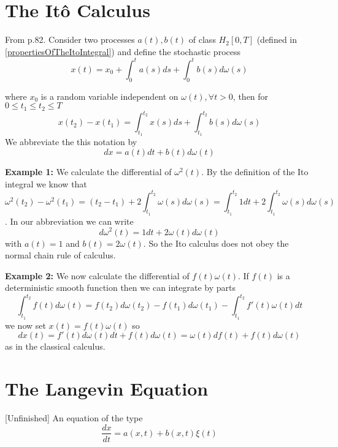 \documentclass[12pt]{report}
\begin{document}
\section{The It\^{o} Calculus}
From \cite{schuss2009theory} p.82. Consider two processes $a(t),b(t)$ of class $H_2[0,T]$ (defined in \ref{propertiesOfTheItoIntegral}) and define the stochastic process
\begin{equation*}
x(t) = x_0 + \int_0^t a(s)ds + \int_0^t b(s)d\omega(s)
\end{equation*}

where $x_0$ is a random variable independent on $\omega(t),\forall t>0$, then for $0\leq t_1\leq t_2 \leq T$
\begin{equation*}
x(t_2)-x(t_1)=\int_{t_1}^{t_2}x(s)ds +\int_{t_1}^{t_2}b(s)d\omega(s)
\end{equation*}
We abbreviate the this notation by 
\begin{equation*}
dx=a(t)dt+b(t)d\omega(t)
\end{equation*}

\textbf{Example 1:} We calculate the differential of $\omega^2(t)$. By the definition of the Ito integral we know that 
\begin{equation*}
\omega^2(t_2)-\omega^2(t_1)=(t_2-t_1)+2\int_{t_1}^{t_2}\omega(s)d\omega(s)=\int_{t_1}^{t_2}1dt+2\int_{t_1}^{t_2}\omega(s)d\omega(s)
\end{equation*}. 
In our abbreviation we can write 
\begin{equation*}
d\omega^2(t) = 1dt+2\omega(t)d\omega(t)
\end{equation*}
with $a(t)=1$ and $b(t)=2\omega(t)$. So the Ito calculus does not obey the normal chain rule of calculus.

\textbf{Example 2:} We now calculate the differential of $f(t)\omega(t)$. If $f(t)$ is a deterministic smooth function then we can integrate by parts
\begin{equation*}
\int_{t_1}^{t_2}f(t)d\omega(t)= f(t_2)d\omega(t_2)-f(t_1)d\omega(t_1)-\int_{t_1}^{t_2}f'(t)\omega(t)dt
\end{equation*}
we now set $x(t)= f(t)\omega(t)$ so 
\begin{equation*}
dx(t) = f'(t)d\omega(t)dt+f(t)d\omega(t)=\omega(t)df(t)+f(t)d\omega(t)
\end{equation*}
as in the classical calculus. 




\section{The Langevin Equation}{[Unfinished]}
An equation of the type 
\begin{equation*}
\frac{dx}{dt}=a(x,t)+b(x,t)\xi(t)
\end{equation*}
\end{document}
